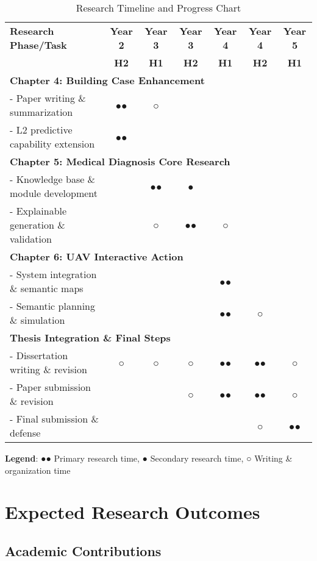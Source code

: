 \begin{table}[H]
\centering
\caption{Research Timeline and Progress Chart}
\label{tab:gantt-chart}
\begin{tabular}{|l|c|c|c|c|c|c|}
\hline
\textbf{Research Phase/Task} & \textbf{Year 2} & \textbf{Year 3} & \textbf{Year 3} & \textbf{Year 4} & \textbf{Year 4} & \textbf{Year 5} \\
 & \textbf{H2} & \textbf{H1} & \textbf{H2} & \textbf{H1} & \textbf{H2} & \textbf{H1} \\
\hline
\multicolumn{7}{|l|}{\textbf{Chapter 4: Building Case Enhancement}} \\
\hline
- Paper writing \& summarization & ●● & ○ &  &  &  &  \\
\hline
- L2 predictive capability extension & ●● &  &  &  &  &  \\
\hline
\multicolumn{7}{|l|}{\textbf{Chapter 5: Medical Diagnosis Core Research}} \\
\hline
- Knowledge base \& module development &  & ●● & ● &  &  &  \\
\hline
- Explainable generation \& validation &  & ○ & ●● & ○ &  &  \\
\hline
\multicolumn{7}{|l|}{\textbf{Chapter 6: UAV Interactive Action}} \\
\hline
- System integration \& semantic maps &  &  &  & ●● &  &  \\
\hline
- Semantic planning \& simulation &  &  &  & ●● & ○ &  \\
\hline
\multicolumn{7}{|l|}{\textbf{Thesis Integration \& Final Steps}} \\
\hline
- Dissertation writing \& revision & ○ & ○ & ○ & ●● & ●● & ○ \\
\hline
- Paper submission \& revision &  &  & ○ & ●● & ●● & ○ \\
\hline
- Final submission \& defense &  &  &  &  & ○ & ●● \\
\hline
\end{tabular}
\end{table}

\textbf{Legend}: ●● Primary research time, ● Secondary research time, ○ Writing \& organization time

\section{Expected Research Outcomes}

\subsection{Academic Contributions}

